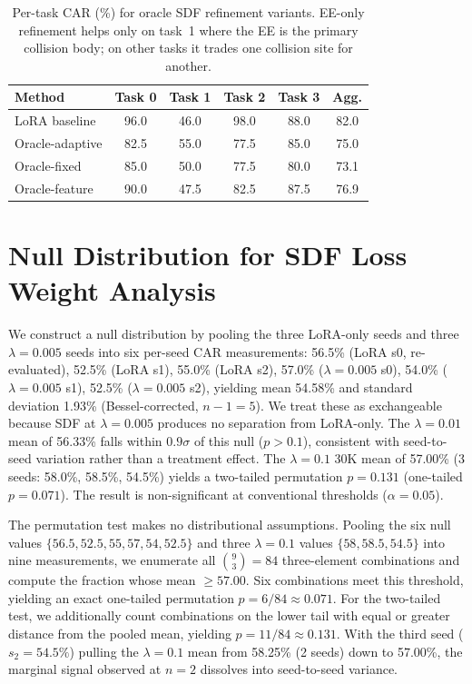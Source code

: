 \begin{table}[h]
\centering
\caption{Per-task CAR (\%) for oracle SDF refinement variants. EE-only refinement helps only on task~1 where the EE is the primary collision body; on other tasks it trades one collision site for another.}
\label{tab:oracle_pertask}
\vspace{2pt}
\small
\begin{tabular}{lccccc}
\toprule
Method & Task 0 & Task 1 & Task 2 & Task 3 & Agg. \\
\midrule
LoRA baseline & 96.0 & 46.0 & 98.0 & 88.0 & 82.0 \\
\midrule
Oracle-adaptive & 82.5 & 55.0 & 77.5 & 85.0 & 75.0 \\
Oracle-fixed & 85.0 & 50.0 & 77.5 & 80.0 & 73.1 \\
Oracle-feature & 90.0 & 47.5 & 82.5 & 87.5 & 76.9 \\
\bottomrule
\end{tabular}
\end{table}


\section{Null Distribution for SDF Loss Weight Analysis}
\label{sec:appendix_null}

We construct a null distribution by pooling the three LoRA-only seeds and three $\lambda = 0.005$ seeds into six per-seed CAR measurements: 56.5\% (LoRA s0, re-evaluated), 52.5\% (LoRA s1), 55.0\% (LoRA s2), 57.0\% ($\lambda{=}0.005$ s0), 54.0\% ($\lambda{=}0.005$ s1), 52.5\% ($\lambda{=}0.005$ s2), yielding mean 54.58\% and standard deviation 1.93\% (Bessel-corrected, $n{-}1 = 5$). We treat these as exchangeable because SDF at $\lambda = 0.005$ produces no separation from LoRA-only. The $\lambda = 0.01$ mean of 56.33\% falls within $0.9\sigma$ of this null ($p > 0.1$), consistent with seed-to-seed variation rather than a treatment effect. The $\lambda = 0.1$ 30K mean of 57.00\% (3 seeds: 58.0\%, 58.5\%, 54.5\%) yields a two-tailed permutation $p = 0.131$ (one-tailed $p = 0.071$). The result is non-significant at conventional thresholds ($\alpha = 0.05$).

The permutation test makes no distributional assumptions. Pooling the six null values $\{56.5, 52.5, 55, 57, 54, 52.5\}$ and three $\lambda = 0.1$ values $\{58, 58.5, 54.5\}$ into nine measurements, we enumerate all $\binom{9}{3} = 84$ three-element combinations and compute the fraction whose mean $\geq 57.00$. Six combinations meet this threshold, yielding an exact one-tailed permutation $p = 6/84 \approx 0.071$. For the two-tailed test, we additionally count combinations on the lower tail with equal or greater distance from the pooled mean, yielding $p = 11/84 \approx 0.131$. With the third seed ($s_2 = 54.5\%$) pulling the $\lambda = 0.1$ mean from 58.25\% (2 seeds) down to 57.00\%, the marginal signal observed at $n = 2$ dissolves into seed-to-seed variance.

